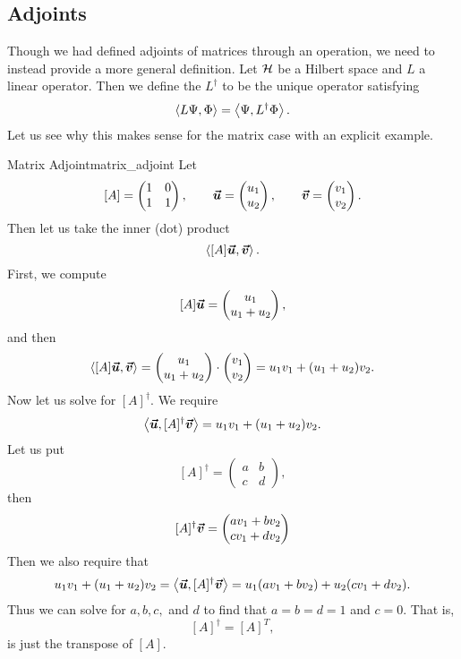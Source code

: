 \subsection{Adjoints}

Though we had defined adjoints of matrices through an operation, we need to instead provide a more general definition.  Let $\mathcal{H}$ be a Hilbert space and $L$ a linear operator.  Then we define the  $L^\dagger$ to be the unique operator satisfying
\[
\left\langle L\Psi, \Phi \right\rangle = \left\langle \Psi, L^\dagger \Phi \right\rangle.
\]
Let us see why this makes sense for the matrix case with an explicit example.

\begin{ex}{Matrix Adjoint}{matrix_adjoint}
	Let 
	\[
		[A] = \begin{pmatrix} 1 & 0\\ 1 & 1 \end{pmatrix}, \qquad \boldsymbol{\boldsymbol{\vec{u}}} = \begin{pmatrix} u_1 \\ u_2  \end{pmatrix}, \qquad \boldsymbol{\boldsymbol{\vec{v}}} = \begin{pmatrix} v_1 \\ v_2 \end{pmatrix}.
	\]
	Then let us take the inner (dot) product
	\[
	\left\langle [A]\boldsymbol{\boldsymbol{\vec{u}}}, \boldsymbol{\boldsymbol{\vec{v}}} \right\rangle.
	\]
	First, we compute
	\[
	[A]\boldsymbol{\boldsymbol{\vec{u}}} = \begin{pmatrix} u_1 \\ u_1+u_2 \end{pmatrix},
	\]
	and then
	\begin{align*}
		\left\langle [A]\boldsymbol{\boldsymbol{\vec{u}}}, \boldsymbol{\boldsymbol{\vec{v}}} \right\rangle = \begin{pmatrix} u_1 \\ u_1+u_2 \end{pmatrix} \cdot \begin{pmatrix}  v_1 \\ v_2 \end{pmatrix} = u_1v_1 + (u_1+u_2)v_2.
	\end{align*}
	Now let us solve for $[A]^\dagger$.  We require
	\[
	\left\langle \boldsymbol{\boldsymbol{\vec{u}}}, [A]^\dagger \boldsymbol{\boldsymbol{\vec{v}}} \right\rangle = u_1v_1 + (u_1+u_2)v_2.
	\]
	Let us put
	\[
	[A]^\dagger = \begin{pmatrix} a & b \\ c & d \end{pmatrix},
	\]
	then 
	\[
	[A]^\dagger \boldsymbol{\boldsymbol{\vec{v}}} = \begin{pmatrix} av_1+bv_2 \\ cv_1 + dv_2 \end{pmatrix}
	\]
	Then we also require that
	\[
	u_1v_1+(u_1+u_2)v_2 = \left\langle \boldsymbol{\boldsymbol{\vec{u}}}, [A]^\dagger \boldsymbol{\boldsymbol{\vec{v}}} \right\rangle = u_1(av_1+bv_2)+u_2(cv_1+dv_2).
	\]
	Thus we can solve for $a,b,c,$ and $d$ to find that $a=b=d=1$ and $c=0$.  That is,
	\[
	[A]^\dagger = [A]^T,
	\]
	is just the transpose of $[A]$.
\end{ex}

